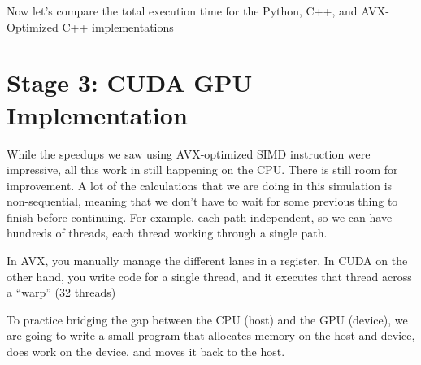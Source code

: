 \documentclass{article}
\begin{document}
Now let's compare the total execution time for the Python, C++, and AVX-Optimized C++ implementations

\begin{figure}[h]
\centering
{}
\end{figure}

\section*{Stage 3: CUDA GPU Implementation}
While the speedups we saw using AVX-optimized SIMD instruction were impressive, all this work in still happening on the CPU.
There is still room for improvement.
A lot of the calculations that we are doing in this simulation is non-sequential, meaning that we don't have to wait for some previous thing to finish before continuing. 
For example, each path independent, so we can have hundreds of threads, each thread working through a single path. 

In AVX, you manually manage the different lanes in a register.
In CUDA on the other hand, you write code for a single thread, and it executes that thread across a ``warp'' (32 threads)

To practice bridging the gap between the CPU (host) and the GPU (device), we are going to write a small program that allocates memory on the host and device, does work on the device, and moves it back to the host.
\end{document}
